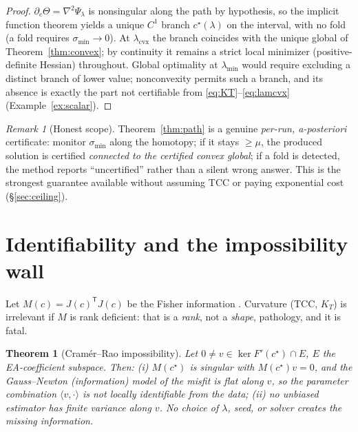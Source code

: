 \documentclass[11pt]{article}
\theoremstyle{plain}
\newtheorem{theorem}{Theorem}[section]
\theoremstyle{definition}
\theoremstyle{remark}
\newtheorem*{remark}{Remark}
\newcommand{\trc}{\mathsf{T}}
\begin{document}
\begin{proof}
$\partial_c\Theta=\nabla^{2}\Psi_\lambda$ is nonsingular along the path
by hypothesis, so the implicit function theorem
\cite{ortega1970,allgower1990} yields a unique $C^{1}$ branch
$c^\star(\lambda)$ on the interval, with no fold (a fold requires
$\sigma_{\min}\to0$). At $\lambda_{\mathrm{cvx}}$ the branch coincides
with the unique global of Theorem~\ref{thm:convex}; by continuity it
remains a strict local minimizer (positive-definite Hessian) throughout.
Global optimality at $\lambda_{\min}$ would require excluding a distinct
branch of lower value; nonconvexity permits such a branch, and its
absence is exactly the part not certifiable from
\eqref{eq:KT}--\eqref{eq:lamcvx} (Example~\ref{ex:scalar}).
\end{proof}

\begin{remark}[Honest scope]
Theorem~\ref{thm:path} is a genuine \emph{per-run, a-posteriori}
certificate: monitor $\sigma_{\min}$ along the homotopy; if it stays
$\ge\mu$, the produced solution is certified \emph{connected to the
certified convex global}; if a fold is detected, the method reports
``uncertified'' rather than a silent wrong answer. This is the strongest
guarantee available without assuming TCC or paying exponential cost
(\S\ref{sec:ceiling}).
\end{remark}

\section{Identifiability and the impossibility wall}\label{sec:ident}

Let $M(c)=J(c)^{\trc}J(c)$ be the Fisher information \cite{rao1945}.
Curvature (TCC, $K_T$) is irrelevant if $M$ is rank deficient: that is a
\emph{rank}, not a \emph{shape}, pathology, and it is fatal.

\begin{theorem}[Cram\'er--Rao impossibility]\label{thm:cr}
Let $0\neq v\in\ker F'(c^\star)\cap E$, $E$ the EA-coefficient subspace.
Then: \textup{(i)} $M(c^\star)$ is singular with $M(c^\star)v=0$, and the
Gauss--Newton (information) model of the misfit is flat along $v$, so the
parameter combination $\langle v,\cdot\rangle$ is not locally identifiable
from the data; \textup{(ii)} no unbiased estimator has finite variance
along $v$. No choice of $\lambda$, seed, or solver creates the missing
information.
\end{theorem}
\end{document}
